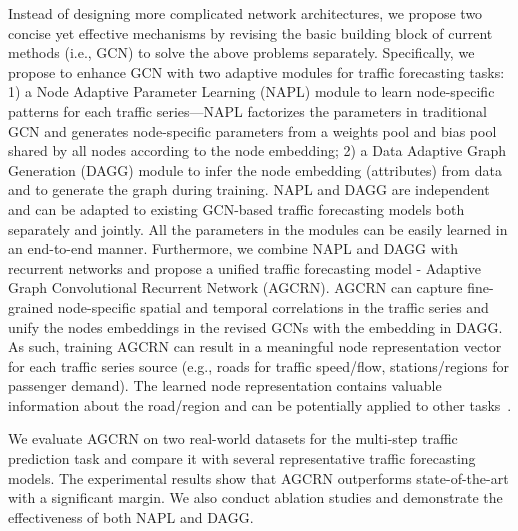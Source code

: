 \documentclass{article}
\begin{document}
Instead of designing more complicated network architectures, we propose two concise yet effective mechanisms by revising the basic building block of current methods (i.e., GCN) to solve the above problems separately. Specifically, we propose to enhance GCN with two adaptive modules for traffic forecasting tasks: 
1) a Node Adaptive Parameter Learning (NAPL) module to learn node-specific patterns for each traffic series---NAPL factorizes the parameters in traditional GCN and generates node-specific parameters from a weights pool and bias pool shared by all nodes according to the node embedding; 
2) a Data Adaptive Graph Generation (DAGG) module to infer the node embedding (attributes) from data and to generate the graph during training.
NAPL and DAGG are independent and can be adapted to existing GCN-based traffic forecasting models both separately and jointly.
All the parameters in the modules can be easily learned in an end-to-end manner.
Furthermore, we combine NAPL and DAGG with recurrent networks and propose a unified traffic forecasting model - Adaptive Graph Convolutional Recurrent Network (AGCRN).
AGCRN can capture fine-grained node-specific spatial and temporal correlations in the traffic series and unify the nodes embeddings in the revised GCNs with the embedding in DAGG. As such, training AGCRN can result in a meaningful node representation vector for each traffic series source (e.g., roads for traffic speed/flow, stations/regions for passenger demand). The learned node representation contains valuable information about the road/region and can be potentially applied to other tasks~\cite{embedding-cikm2019}. 

We evaluate AGCRN on two real-world datasets for the multi-step traffic prediction task and compare it with several representative traffic forecasting models. The experimental results show that AGCRN outperforms state-of-the-art with a significant margin. We also conduct ablation studies and demonstrate the effectiveness of both NAPL and DAGG. 
\end{document}

